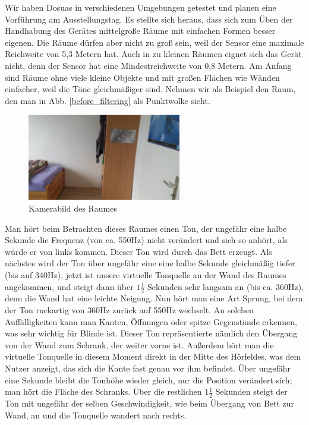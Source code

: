 \documentclass[a4paper,12pt,ngerman]{scrartcl}
\begin{document}
Wir haben Dosuas in verschiedenen Umgebungen getestet und planen eine Vorführung am Ausstellungstag.
Es stellte sich heraus, dass sich zum Üben der Handhabung des Gerätes mittelgroße Räume mit einfachen
Formen besser eigenen. Die Räume dürfen aber nicht zu groß sein, weil der Sensor eine maximale Reichweite
von 5,3 Metern hat. Auch in zu kleinen Räumen eignet sich das Gerät nicht, denn der Sensor hat eine  Mindestreichweite von 0,8 Metern. Am Anfang sind Räume ohne viele kleine Objekte und mit großen 
Flächen wie Wänden einfacher, weil die Töne gleichmäßiger sind.
Nehmen wir als Beispiel den Raum, den man in Abb. \ref{before_filtering} als Punktwolke sieht. 
\begin{figure}[h]
	\centering
	\includegraphics[angle=180,width=0.6\textwidth]{20180120_114953}
	\caption{Kamerabild des Raumes}
	\label{normal_picture}
\end{figure} \par
Man hört beim Betrachten dieses Raumes einen Ton, der ungefähr eine halbe Sekunde die Frequenz (von ca. 550Hz) nicht verändert und sich so anhört, als würde er von links kommen. Dieser Ton wird durch das Bett
erzeugt. Als nächstes wird der Ton über ungefähr eine eine halbe Sekunde gleichmäßig tiefer (bis auf 340Hz), 
jetzt ist unsere virtuelle Tonquelle an der Wand des Raumes angekommen, und steigt dann über $1\frac{1}{2}$ Sekunden sehr langsam an (bis ca. 360Hz), denn die Wand hat eine leichte Neigung. 
Nun hört man eine Art Sprung, bei dem der Ton ruckartig von 360Hz zurück auf 550Hz wechselt. An solchen Auffälligkeiten kann man Kanten, Öffnungen oder spitze Gegenstände erkennen, was sehr wichtig für Blinde
ist. Dieser Ton repräsentierte nämlich den Übergang von der Wand zum Schrank, der weiter vorne ist. Außerdem hört
man die virtuelle Tonquelle in diesem Moment direkt in der Mitte des Hörfeldes, was dem Nutzer anzeigt, das sich
die Kante fast genau vor ihm befindet. Über ungefähr eine Sekunde bleibt die Tonhöhe wieder gleich, nur die Position
verändert sich; man hört die Fläche des Schranks. Über die restlichen $1\frac{1}{2}$ Sekunden steigt der Ton mit 
ungefähr der selben Geschwindigkeit, wie beim Übergang von Bett zur Wand, an und die Tonquelle wandert nach rechts.
\end{document}
